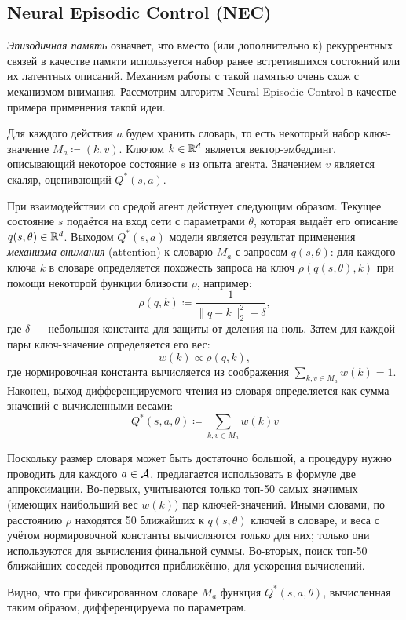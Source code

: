 \subsection{Neural Episodic Control (NEC)}

\emph{Эпизодичная память} означает, что вместо (или дополнительно к) рекуррентных связей в качестве памяти используется набор ранее встретившихся состояний или их латентных описаний. Механизм работы с такой памятью очень схож с механизмом внимания. Рассмотрим алгоритм Neural Episodic Control в качестве примера применения такой идеи.

Для каждого действия $a$ будем хранить словарь, то есть некоторый набор ключ-значение $M_a \coloneqq (k, v)$. Ключом $k \in \mathbb{R}^d$ является вектор-эмбеддинг, описывающий некоторое состояние $s$ из опыта агента. Значением $v$ является скаляр, оценивающий $Q^*(s, a)$.

При взаимодействии со средой агент действует следующим образом. Текущее состояние $s$ подаётся на вход сети с параметрами $\theta$, которая выдаёт его описание $q(s, \theta) \in \mathbb{R}^d$. Выходом $Q^*(s, a)$ модели является результат применения \emph{механизма внимания} (attention) к словарю $M_a$ с запросом $q(s, \theta)$: для каждого ключа $k$ в словаре определяется похожесть запроса на ключ $\rho(q(s, \theta), k)$ при помощи некоторой функции близости $\rho$, например:
$$\rho(q, k) \coloneqq \frac{1}{\|q - k\|_2^2 + \delta},$$
где $\delta$ --- небольшая константа для защиты от деления на ноль. Затем для каждой пары ключ-значение определяется его вес:
$$w(k) \propto \rho(q, k),$$
где нормировочная константа вычисляется из соображения $\sum_{k, v \in M_a} w(k) = 1$. Наконец, выход дифференцируемого чтения из словаря определяется как сумма значений с вычисленными весами:
$$Q^*(s, a, \theta) \coloneqq \sum_{k, v \in M_a} w(k)v$$

Поскольку размер словаря может быть достаточно большой, а процедуру нужно проводить для каждого $a \in \mathcal{A}$, предлагается использовать в формуле две аппроксимации. Во-первых, учитываются только топ-50 самых значимых (имеющих наибольший вес $w(k)$) пар ключей-значений. Иными словами, по расстоянию $\rho$ находятся 50 ближайших к $q(s, \theta)$ ключей в словаре, и веса с учётом нормировочной константы вычисляются только для них; только они используются для вычисления финальной суммы. Во-вторых, поиск топ-50 ближайших соседей проводится приближённо, для ускорения вычислений.

Видно, что при фиксированном словаре $M_a$ функция $Q^*(s, a, \theta)$, вычисленная таким образом, дифференцируема по параметрам.

